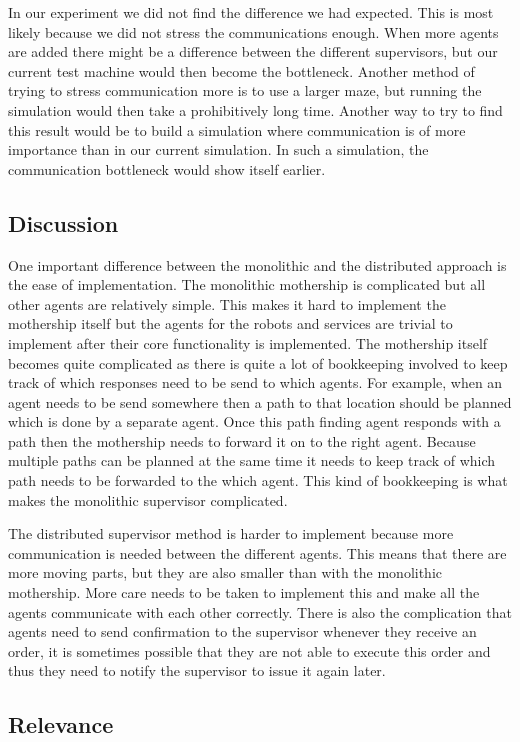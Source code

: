 In our experiment we did not find the difference we had expected. This is most
likely because we did not stress the communications enough. When more agents
are added there might be a difference between the different supervisors, but
our current test machine would then become the bottleneck. Another method of
trying to stress communication more is to use a larger maze, but running the
simulation would then take a prohibitively long time. Another way to try
to find this result would be to build a simulation where communication is of
more importance than in our current simulation. In such a simulation, the
communication bottleneck would show itself earlier. 

\subsection{Discussion}

One important difference between the monolithic and the distributed approach is
the ease of implementation. The monolithic mothership is complicated but all
other agents are relatively simple. This makes it hard to implement the
mothership itself but the agents for the robots and services are trivial to
implement after their core functionality is implemented. The mothership itself
becomes quite complicated as there is quite a lot of bookkeeping involved to
keep track of which responses need to be send to which agents. For example,
when an agent needs to be send somewhere then a path to that location should
be planned which is done by a separate agent. Once this path finding agent
responds with a path then the mothership needs to forward it on to the right
agent. Because multiple paths can be planned at the same time it needs to keep
track of which path needs to be forwarded to the which agent. This kind of
bookkeeping is what makes the monolithic supervisor complicated.

The distributed supervisor method is harder to implement because more
communication is needed between the different agents. This means that there are
more moving parts, but they are also smaller than with the monolithic
mothership. More care needs to be taken to implement this and make all the
agents communicate with each other correctly. There is also the complication
that agents need to send confirmation to the supervisor whenever they receive
an order, it is sometimes possible that they are not able to execute this order
and thus they need to notify the supervisor to issue it again later.

\subsection{Relevance}


